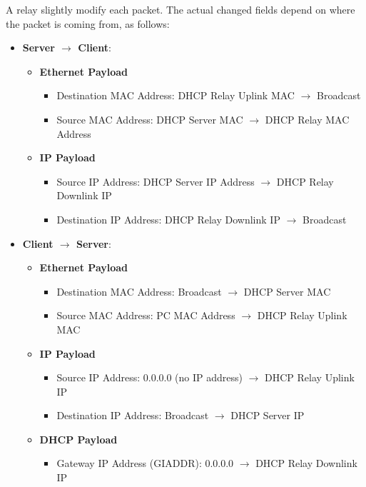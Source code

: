 A relay slightly modify each packet. The actual changed fields depend on where the packet is coming from, as follows:
\begin{itemize}
	\item \textbf{Server $\rightarrow$ Client}:
	\begin{itemize}
		\item \textbf{Ethernet Payload}
		\begin{itemize}
			\item Destination MAC Address: DHCP Relay Uplink MAC $\to$ Broadcast
			\item Source MAC Address: DHCP Server MAC $\to$ DHCP Relay MAC Address
		\end{itemize} 
		\item \textbf{IP Payload}
		\begin{itemize}
			\item Source IP Address: DHCP Server IP Address $\to$ DHCP Relay Downlink IP
			\item Destination IP Address: DHCP Relay Downlink IP $\to$ Broadcast
		\end{itemize}	
	\end{itemize}
	\item \textbf{Client $\rightarrow$ Server}:
	\begin{itemize}
		\item \textbf{Ethernet Payload}
		\begin{itemize}
			\item Destination MAC Address: Broadcast $\to$ DHCP Server MAC
			\item Source MAC Address: PC MAC Address $\to$ DHCP Relay Uplink MAC 
		\end{itemize}
		\item \textbf{IP Payload}
		\begin{itemize}
			\item Source IP Address: 0.0.0.0 (no IP address) $\to$ DHCP Relay Uplink IP
			\item Destination IP Address: Broadcast $\to$ DHCP Server IP
		\end{itemize}
		\item \textbf{DHCP Payload}
		\begin{itemize}
			\item Gateway IP Address (GIADDR): 0.0.0.0 $\to$ DHCP Relay Downlink IP
		\end{itemize}
	\end{itemize}
\end{itemize}

